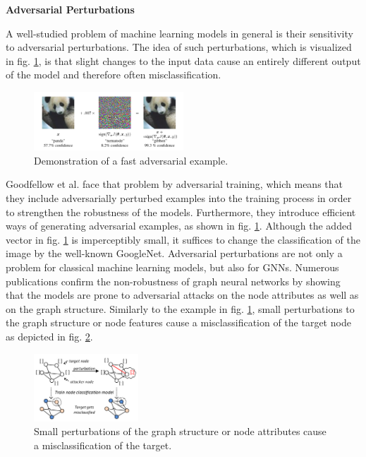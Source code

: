 \documentclass[a4paper,preprint]{sig-alternate}
\begin{document}
\textbf{Adversarial Perturbations}\newline

A well-studied problem of machine learning models in general is their sensitivity to adversarial perturbations. \cite{Goodfellow_2015}
The idea of such perturbations, which is visualized in fig. \ref{fig:adversarial_example}, is that slight changes to the input data
cause an entirely different output of the model and therefore often misclassification.

\begin{figure}[h]
    \centering
    \includegraphics[width=0.5\textwidth]{img/adversarial_example.png}
    \caption{Demonstration of a fast adversarial example. \cite{Goodfellow_2015}}
    \label{fig:adversarial_example}
\end{figure}

Goodfellow et al. \cite{Goodfellow_2015} face that problem by adversarial training, which means that they include adversarially 
perturbed examples into the training process in order to strengthen the robustness of the models. Furthermore, they introduce 
efficient ways of generating adversarial examples, as shown in fig. \ref{fig:adversarial_example}.
Although the added vector in fig. \ref{fig:adversarial_example} is imperceptibly small, it suffices to change the classification
of the image by the well-known GoogleNet. \cite{Goodfellow_2015}\newline
Adversarial perturbations are not only a problem for classical machine learning models, but also for GNNs.
Numerous publications confirm the non-robustness of graph neural networks by showing that the models are prone to
adversarial attacks on the node attributes as well as on the graph structure. \cite{Zuegner_2019}
Similarly to the example in fig. \ref{fig:adversarial_example}, small perturbations to the graph structure or node features 
cause a misclassification of the target node as depicted in fig. \ref{fig:adversarial_GNN}.

\begin{figure}[h]
    \centering
    \includegraphics[width=0.35\textwidth]{img/adversarial_GNN.png}
    \caption{Small perturbations of the graph structure or node attributes cause a misclassification of the target. \cite{Zuegner_2018}}
    \label{fig:adversarial_GNN}
\end{figure}
\end{document}
